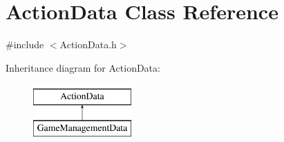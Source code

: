 \hypertarget{classActionData}{\section{Action\-Data Class Reference}
\label{classActionData}
}


{\ttfamily \#include $<$Action\-Data.\-h$>$}

Inheritance diagram for Action\-Data\-:\begin{figure}[H]
\begin{center}
\leavevmode
\includegraphics[height=2.000000cm]{classActionData}
\end{center}
\end{figure}
